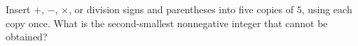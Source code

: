 Insert $+$, $-$, $\times$, or division signs and parentheses into five copies of $5$, using each copy once. What is the second-smallest nonnegative integer that cannot be obtained?
